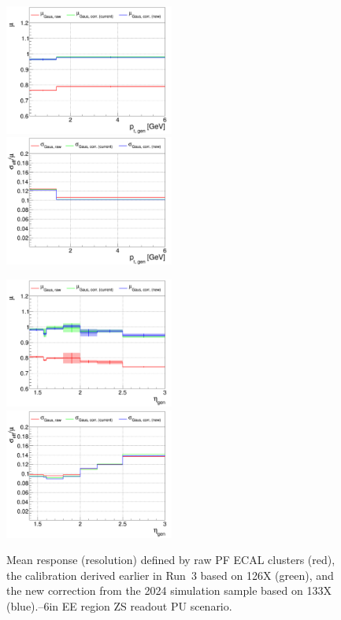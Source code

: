 \begin{figure}
\includegraphics[width=0.495\textwidth]{./plots_pdf/ECAL_plots/plotsPU/EE/ZS/pdf/GENPT/EEZS_GENPT_0000_0006_MuOverBins.pdf}
\includegraphics[width=0.495\textwidth]{./plots_pdf/ECAL_plots/plotsPU/EE/ZS/pdf/GENPT/EEZS_GENPT_0000_0006_EffSigmaOverBins.pdf}

\includegraphics[width=0.495\textwidth]{./plots_pdf/ECAL_plots/plotsPU/EE/ZS/pdf/GENETA/EEZS_GENETA_0000_0006_MuOverBins.pdf}
\includegraphics[width=0.495\textwidth]{./plots_pdf/ECAL_plots/plotsPU/EE/ZS/pdf/GENETA/EEZS_GENETA_0000_0006_EffSigmaOverBins.pdf}

\caption[$\mu$ ($\sigma_\mathrm{eff}$) vs. \pt of PF ECAL cluster - EE ZS readout PU scenario]{Mean response (resolution) defined by raw PF ECAL clusters (red), the calibration derived earlier in Run~3 based on 126X (green), and the new correction from the 2024 simulation sample based on 133X (blue).--6\GeV in EE region ZS readout PU scenario.}
\label{fig:PU_EEZS}
\end{figure}

